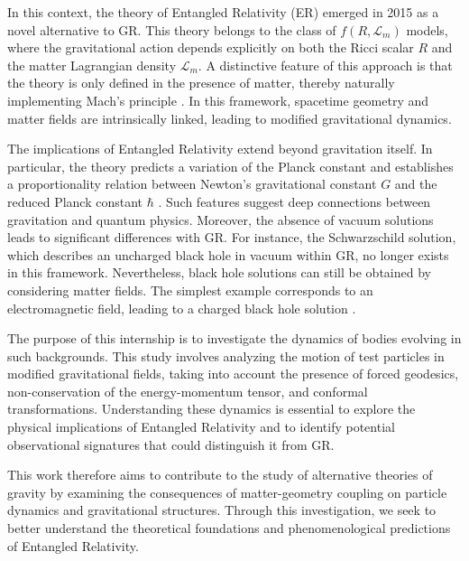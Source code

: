 \documentclass[floats,floatfix,aps, preprintnumbers,nofootinbib]{revtex4-2}
\newcommand{\mcal}{\mathcal}
\begin{document}
In this context, the theory of Entangled Relativity (ER) emerged in 2015 as a novel alternative to GR. This theory belongs to the class of $f(R,\mcal L_m)$ models, where the gravitational action depends explicitly on both the Ricci scalar $R$ and the matter Lagrangian density $\mcal L_m$. A distinctive feature of this approach is that the theory is only defined in the presence of matter, thereby naturally implementing Mach's principle \cite{Minazzoli2021}. In this framework, spacetime geometry and matter fields are intrinsically linked, leading to modified gravitational dynamics.

The implications of Entangled Relativity extend beyond gravitation itself. In particular, the theory predicts a variation of the Planck constant and establishes a proportionality relation between Newton's gravitational constant $G$ and the reduced Planck constant $\hbar$ \cite{minazzoli2025quantumactionentangledrelativity}. Such features suggest deep connections between gravitation and quantum physics. Moreover, the absence of vacuum solutions leads to significant differences with GR. For instance, the Schwarzschild solution, which describes an uncharged black hole in vacuum within GR, no longer exists in this framework. Nevertheless, black hole solutions can still be obtained by considering matter fields. The simplest example corresponds to an electromagnetic field, leading to a charged black hole solution \cite{Wavasseur2025}.

The purpose of this internship is to investigate the dynamics of bodies evolving in such backgrounds. This study involves analyzing the motion of test particles in modified gravitational fields, taking into account the presence of forced geodesics, non-conservation of the energy-momentum tensor, and conformal transformations. Understanding these dynamics is essential to explore the physical implications of Entangled Relativity and to identify potential observational signatures that could distinguish it from GR.

This work therefore aims to contribute to the study of alternative theories of gravity by examining the consequences of matter-geometry coupling on particle dynamics and gravitational structures. Through this investigation, we seek to better understand the theoretical foundations and phenomenological predictions of Entangled Relativity.\\





\end{document}
